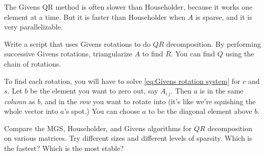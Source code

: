 The Givens QR method is often slower than Householder, because it works one element at a time. But it is faster than Householder when $A$ is sparse, and it is very parallelizable.

\begin{problem}
Write a script that uses Givens rotations to do $QR$ decomposition. By performing successive Givens rotations, triangularize $A$ to find $R$. You can find $Q$ using the chain of rotations.

To find each rotation, you will have to solve \eqref{eq:Givens rotation system} for $c$ and $s$. Let $b$ be the element you want to zero out, say $A_{i\,j}$. Then $a$ is in the same \emph{column} as $b$, and in the \emph{row} you want to rotate into (it's like we're squishing the whole vector into $a$'s spot.) You can choose $a$ to be the diagonal element above $b$.
\end{problem}

\begin{problem} 
Compare the MGS, Householder, and Givens algorithms for $QR$ decomposition on various matrices. Try different sizes and different levels of sparsity. Which is the fastest? Which is the most stable?
\end{problem}


